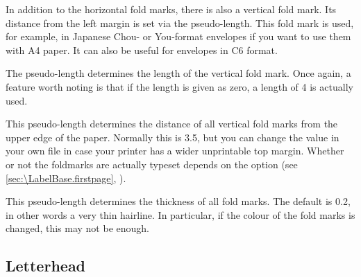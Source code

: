 \begin{Declaration}
\end{Declaration}
In addition to the horizontal fold marks,
there is also a vertical fold mark. Its distance from the left margin is set
via the  pseudo-length. This fold mark is used, for
example, in Japanese Chou- or You-format envelopes if you want to use them
with A4 paper. It can also be useful for envelopes in C6 format.%
\EndIndexGroup


\begin{Declaration}
\end{Declaration}
The 
pseudo-length determines the length of the vertical fold mark. Once again, a
feature worth noting is that if the length is given as zero, a length of
4 is actually used.%
\EndIndexGroup


\begin{Declaration}
\end{Declaration}
This pseudo-length determines the distance of
all vertical fold marks from the upper edge of the paper. Normally this is
3.5, but you can change the value in your own
 file in case your printer has a wider unprintable
top margin. Whether or not the foldmarks are actually typeset depends on the 
%
%
 option (see
\autoref{sec:\LabelBase.firstpage}, ).
%
\EndIndexGroup


\begin{Declaration}
\end{Declaration}
This pseudo-length determines the
thickness of all fold marks. The default is 0.2, in other words a
very thin hairline. In particular, if the colour of the fold
marks is changed, this may not be enough.%
\EndIndexGroup
%
\EndIndexGroup


\subsection{Letterhead}
\BeginIndexGroup
{}%


